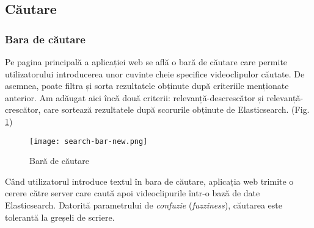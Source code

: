 \subsection{Căutare}
\subsubsection{Bara de căutare}
Pe pagina principală a aplicației web se află o bară de căutare care permite utilizatorului
introducerea unor cuvinte cheie specifice videoclipulor căutate. De asemnea, poate filtra
și sorta rezultatele obținute după criteriile menționate anterior. Am adăugat aici încă două
criterii: relevanță-descrescător și relevanță-crescător, care sortează rezultatele după
scorurile obținute de Elasticsearch.
(Fig. \ref{fig:search-bar})

\begin{figure}[h]
    \centering
    \texttt{[image: search-bar-new.png]}
    \caption{Bară de căutare}
    \label{fig:search-bar}
\end{figure}

\par
Când utilizatorul introduce textul în bara de căutare, aplicația web trimite o cerere 
către server care caută apoi videoclipurile într-o bază de date Elasticsearch. Datorită
parametrului de \textit{confuzie} (\textit{fuzziness}), căutarea este tolerantă la greșeli
de scriere.

